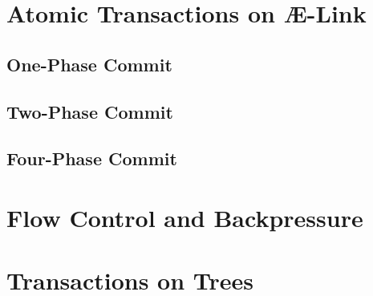 \documentclass[../../../OAE-SPEC-MAIN.tex]{subfiles}
\begin{document}
\section{Atomic Transactions on Æ-Link}

\subsection {One-Phase Commit}

\subsection {Two-Phase Commit}

\subsection {Four-Phase Commit}

\section{Flow Control and Backpressure}

\section{Transactions on Trees}
\end{document}
